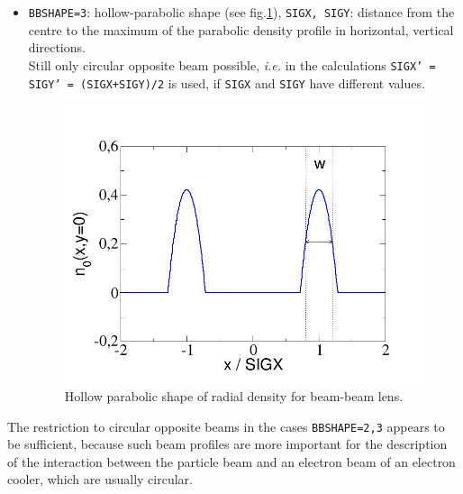 \begin{madlist}
\begin{itemize}
       \item  \texttt{BBSHAPE=3}: hollow-parabolic shape (see
       fig.\ref{fig:beambeam-n-hollowparabol}), \texttt{SIGX, SIGY}: distance 
       from the centre to the maximum of the parabolic density profile in 
       horizontal, vertical directions. \\
       Still only circular opposite beam possible, \textsl{i.e.} in the
       calculations \texttt{SIGX' = SIGY' = (SIGX+SIGY)/2} is 
       used, if \texttt{SIGX} and \texttt{SIGY} have different values.

\begin{figure}[h]
  \centering
  \includegraphics[width=420bp]{jpg/beambeam_n_hollowparabol.jpg}
  \caption{Hollow parabolic shape of radial density for beam-beam lens.} 
  \label{fig:beambeam-n-hollowparabol}
\end{figure}

     \end{itemize}
     
     The restriction to circular opposite beams in the cases \texttt{BBSHAPE=2,3}
     appears to be sufficient, because such beam profiles are more important 
     for the description of the interaction between the particle beam and 
     an electron beam of an electron cooler, which are usually circular. 
     

\end{madlist}
